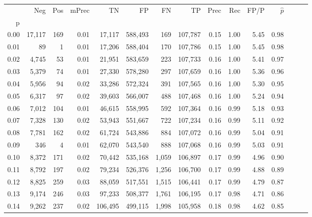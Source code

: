 \begin{tabular}{rrrrrrrrrrrrrrr}
\toprule
{} &     Neg &    Pos & mPrec &       TN &       FP &       FN &       TP &  Prec &   Rec &  FP/P & $\hat{p}$ \\
p    &         &        &       &          &          &          &          &       &       &       &           \\
\midrule
0.00 &  17,117 &    169 &  0.01 &   17,117 &  588,493 &      169 &  107,787 &  0.15 &  1.00 &  5.45 &      0.98 \\
0.01 &      89 &      1 &  0.01 &   17,206 &  588,404 &      170 &  107,786 &  0.15 &  1.00 &  5.45 &      0.98 \\
0.02 &   4,745 &     53 &  0.01 &   21,951 &  583,659 &      223 &  107,733 &  0.16 &  1.00 &  5.41 &      0.97 \\
0.03 &   5,379 &     74 &  0.01 &   27,330 &  578,280 &      297 &  107,659 &  0.16 &  1.00 &  5.36 &      0.96 \\
0.04 &   5,956 &     94 &  0.02 &   33,286 &  572,324 &      391 &  107,565 &  0.16 &  1.00 &  5.30 &      0.95 \\
0.05 &   6,317 &     97 &  0.02 &   39,603 &  566,007 &      488 &  107,468 &  0.16 &  1.00 &  5.24 &      0.94 \\
0.06 &   7,012 &    104 &  0.01 &   46,615 &  558,995 &      592 &  107,364 &  0.16 &  0.99 &  5.18 &      0.93 \\
0.07 &   7,328 &    130 &  0.02 &   53,943 &  551,667 &      722 &  107,234 &  0.16 &  0.99 &  5.11 &      0.92 \\
0.08 &   7,781 &    162 &  0.02 &   61,724 &  543,886 &      884 &  107,072 &  0.16 &  0.99 &  5.04 &      0.91 \\
0.09 &     346 &      4 &  0.01 &   62,070 &  543,540 &      888 &  107,068 &  0.16 &  0.99 &  5.03 &      0.91 \\
0.10 &   8,372 &    171 &  0.02 &   70,442 &  535,168 &    1,059 &  106,897 &  0.17 &  0.99 &  4.96 &      0.90 \\
0.11 &   8,792 &    197 &  0.02 &   79,234 &  526,376 &    1,256 &  106,700 &  0.17 &  0.99 &  4.88 &      0.89 \\
0.12 &   8,825 &    259 &  0.03 &   88,059 &  517,551 &    1,515 &  106,441 &  0.17 &  0.99 &  4.79 &      0.87 \\
0.13 &   9,174 &    246 &  0.03 &   97,233 &  508,377 &    1,761 &  106,195 &  0.17 &  0.98 &  4.71 &      0.86 \\
0.14 &   9,262 &    237 &  0.02 &  106,495 &  499,115 &    1,998 &  105,958 &  0.18 &  0.98 &  4.62 &      0.85 \\

\end{tabular}
